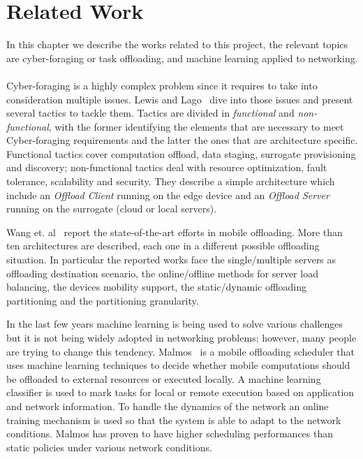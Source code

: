 \chapter{Related Work}
\label{ch:related_work}
In this chapter we describe the works related to this project, the relevant topics are cyber-foraging or task offloading, and machine learning applied to networking.\\\\
Cyber-foraging is a highly complex problem since it requires to take into consideration multiple issues. Lewis and Lago~\cite{catalog} dive into those issues and present several tactics to tackle them. Tactics are divided in \textit{functional} and \textit{non-functional}, with the former identifying the elements that are necessary to meet Cyber-foraging requirements and the latter the ones that are architecture specific. Functional tactics cover computation offload, data staging, surrogate provisioning and discovery; non-functional tactics deal with resource optimization, fault tolerance, scalability and security. They describe a simple architecture which include an \textit{Offload Client} running on the edge device and an \textit{Offload Server} running on the surrogate (cloud or local servers).

Wang et. al~\cite{edge_cloud_offloading_undersubmission:} report the state-of-the-art efforts in mobile offloading. More than ten architectures are described, each one in a different possible offloading situation. In particular the reported works face the single/multiple servers as offloading destination scenario, the online/offline methods for server load balancing, the devices mobility support, the static/dynamic offloading partitioning and the partitioning granularity.

In the last few years machine learning is being used to solve various challenges but it is not being widely adopted in networking problems; however, many people are trying to change this tendency. Malmos~\cite{malmos} is a mobile offloading scheduler that uses machine learning techniques to decide whether mobile computations should be offloaded to external resources or executed locally. A machine learning classifier is used to mark tasks for local or remote execution based on application and network information. To handle the dynamics of the network an online training mechanism is used so that the system is able to adapt to the network conditions. Malmos has proven to have higher scheduling performances than static policies under various network conditions.

